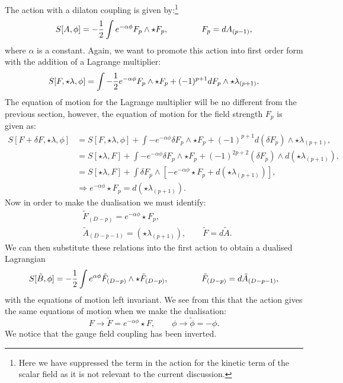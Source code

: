 The action with a dilaton coupling is given by:\footnote{Here we have suppressed the term in the action for the kinetic term of the scalar field as it is not relevant to the current discussion.}
\begin{equation*}
S[A, \phi] = -\frac{1}{2} \int e^{- \alpha \phi}  F_p \wedge \star F_p ,\qquad \qquad F_p = dA_{(p-1)},
\end{equation*}
where $\alpha$ is a constant. Again, we want to promote this action into first order form with the addition of a Lagrange multiplier:
\begin{equation}
\label{eq:firstorderapp2}
S[F, \star \lambda, \phi] = \int -\frac{1}{2} e^{- \alpha \phi} F_p \wedge \star F_p + (-1)^{p+1} d F_p \wedge \star \lambda_{(p+1)}.
\end{equation}
The equation of motion for the Lagrange multiplier will be no different from the previous section, however, the equation of motion for the field strength $F_p$ is given as:
\begin{equation*}
\begin{aligned}
		S[F + \delta F, \star \lambda, \phi] &= S[F, \star \lambda, \phi] + \int - e^{-\alpha \phi} \delta F_p \wedge \star F_p + (-1)^{p+1} d(\delta F_p)\wedge \star \lambda_{(p+1)},\\
		&= S[\star \lambda, F] + \int - e^{-\alpha \phi}  \delta F_p \wedge \star F_p + (-1)^{2p + 2} (\delta F_p)\wedge d(\star \lambda_{(p+1)}),\\
		&= S[\star \lambda, F] + \int \delta F_p \wedge \left[- e^{-\alpha \phi} \star F_p  + d\left(\star \lambda_{(p+1)} \right) \right],\\
		&\Rightarrow e^{-\alpha \phi} \star F_p = d(\star \lambda_{(p+1)}).
\end{aligned}
\end{equation*}
Now in order to make the dualisation we must identify:
\begin{equation*}
	\begin{aligned}
		&\tilde{F}_{(D-p)} = e^{-\alpha \phi} \star F_p, \\
		&\tilde{A}_{(D-p-1)} = (\star \lambda_{(p+1)}), \qquad \tilde{F} = d\tilde{A}.
	\end{aligned}
\end{equation*}
We can then substitute these relations into the first action  to obtain a dualised Lagrangian
\begin{equation*}
S[\tilde{B}, \phi] = -\frac{1}{2} \int e^{\alpha \phi}  \tilde{F}_{(D-p)} \wedge \star \tilde{F}_{(D-p)} ,\qquad \qquad \tilde{F}_{(D-p)} = d\tilde{A}_{(D-p-1)},
\end{equation*}
with the equations of motion left invariant. We see from this that the action gives the same equations of motion when we make the dualisation:
\begin{equation*}
	F \rightarrow \tilde{F} = e^{-\alpha \phi} \star 
	F, \qquad \phi \rightarrow \tilde{\phi} = -\phi.
\end{equation*}
We notice that the gauge field coupling has been inverted.

